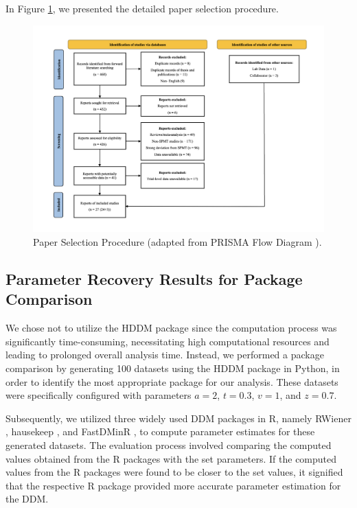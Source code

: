 \documentclass[sn-apa]{sn-jnl}%
\theoremstyle{thmstyleone}%
\theoremstyle{thmstyletwo}%
\theoremstyle{thmstylethree}%
\begin{document}
In Figure \ref{fig:Paper_selection}, we presented the detailed paper selection procedure. 
\begin{figure}[!ht]
	\centering
	\includegraphics[width=1\textwidth]{./Figure/Fig2_paper_selection.png}
	\caption[Paper Selection Procedure (adapted from PRISMA Flow Diagram \parencite{page2021prisma}).]{Paper Selection Procedure (adapted from PRISMA Flow Diagram \parencite{page2021prisma}).}
	\label{fig:Paper_selection}
\end{figure}


\subsection{Parameter Recovery Results for Package Comparison }\label{sec:ParameterRecovery}

We chose not to utilize the HDDM package \parencite{wiecki2013hddm} since the computation process was significantly time-consuming, necessitating high computational resources and leading to prolonged overall analysis time. Instead, we performed a package comparison by generating 100 datasets using the HDDM package in Python, in order to identify the most appropriate package for our analysis. These datasets were specifically configured with parameters $a = 2$, $t = 0.3$, $v = 1$, and $z = 0.7$. 

Subsequently, we utilized three widely used DDM packages in R, namely RWiener \parencite{viechtbauer2010conducting}, hausekeep \parencite{Lin2019how}, and FastDMinR \parencite{voss2007fast}, to compute parameter estimates for these generated datasets. The evaluation process involved comparing the computed values obtained from the R packages with the set parameters. If the computed values from the R packages were found to be closer to the set values, it signified that the respective R package provided more accurate parameter estimation for the DDM.
\end{document}
